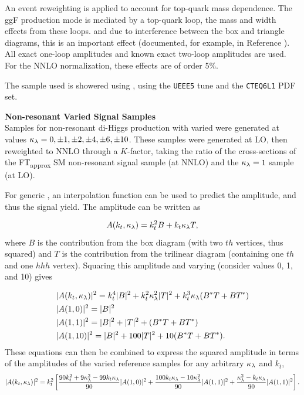 An event reweighting is applied to account for top-quark mass dependence. The \gls{ggF} production mode is mediated by a top-quark loop, the mass and width effects from these loops. and due to interference between the box and triangle diagrams, this is an important effect (documented, for example, in Reference \cite{top-quark-mass-example}). All exact one-loop amplitudes and known exact two-loop amplitudes are used. For the \gls{NNLO} normalization, these effects are of order 5\%.

The sample used is showered using \HERWIGpp \cite{herwigpp}, using the \texttt{UEEE5} tune and the \texttt{CTEQ6L1} PDF set.


\noindent\textbf{Non-resonant Varied \klambda Signal Samples}\\
\indent Samples for non-resonant di-Higgs production with varied \klambda were generated at values $\kappa_{\lambda} = 0, \pm 1, \pm 2, \pm 4, \pm 6, \pm 10$. These samples were generated at \gls{LO}, then reweighted to \gls{NNLO} through a $K$-factor, taking the ratio of the cross-sections of the FT\textsubscript{approx} \gls{SM} non-resonant signal sample (at \gls{NNLO}) and the $\kappa_{\lambda} =1$ sample (at \gls{LO}).

For generic \klambda, an interpolation function can be used to predict the amplitude, and thus the signal yield. The amplitude can be written as

\begin{equation}
  A(k_t,\kappa_{\lambda}) = k_t^2 B + k_t \kappa_{\lambda} T,
\end{equation}
%
where $B$ is the contribution from the box diagram (with two $th$ vertices, thus squared) and $T$ is the contribution from the trilinear diagram (containing one $th$ and one $hhh$ vertex). Squaring this amplitude and varying \klambda (consider values 0, 1, and 10) gives

\begin{align}
  &|A(k_t,\kappa_{\lambda})|^2 = k_t^4 |B|^2 + k_t^2\kappa_{\lambda}^2 |T|^2 + k_t^3\kappa_{\lambda}(B^*T + BT^*)\\
  &|A(1,0)|^2 = |B|^2\\
  &|A(1,1)|^2 = |B|^2 + |T|^2 + (B^*T + BT^*)\\
  &|A(1,10)|^2 = |B|^2 + 100|T|^2 + 10(B^*T + BT^*).
\end{align}
%
These equations can then be combined to express the squared amplitude in terms of the amplitudes of the varied reference samples for any arbitrary $\kappa_{\lambda}$ and $k_t$,
\begin{equation}
  |A(k_t,\kappa_{\lambda})|^2 = k_t^2 \left[ 
    \frac{90 k_t^2 + 9\kappa_{\lambda}^2 - 99k_t\kappa_{\lambda}}{90}|A(1,0)|^2 +
    \frac{100 k_t\kappa_{\lambda} - 10\kappa_{\lambda}^2}{90}|A(1,1)|^2 +
    \frac{\kappa_{\lambda}^2 - k_t\kappa_{\lambda}}{90}|A(1,1)|^2 \right].
\end{equation}

